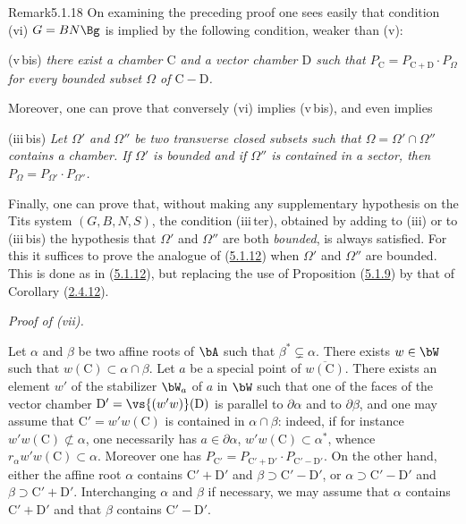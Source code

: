 \documentclass[12pt,a4paper,oneside,english]{smfart}
\makeatletter
\newcommand{\btanchor}[1]{\leavevmode\Hy@raisedlink{\hypertarget{bt:#1}{}}}
\newcommand{\btpageanchor}[1]{\Hy@raisedlink{\hypertarget{p:#1}{}}}
\newcommand{\btref}[1]{\hyperlink{bt:#1}{#1}}
\newcommand{\btpage}[1]{\marginnote{p.~#1}\btpageanchor{#1}}
\newcommand{\pg}[1]{\btpage{#1}}
\theoremstyle{definition}
\theoremstyle{bt}
\makeatother
\begin{document}
\begin{btstat}{Remark}{5.1.18}\btanchor{5.1.18}
\upshape
On examining the preceding proof one sees easily that condition (vi)
$G=BN\Bg$ is implied by the following condition, weaker than (v):

\medskip
\noindent
(v\,bis) \emph{there exist a chamber $\mathrm{C}$ and a vector chamber
$\mathrm{D}$ such that $P_{\mathrm{C}}=P_{\mathrm{C}+\mathrm{D}}\cdot P_{\Omega}$
for every bounded subset $\Omega$ of $\mathrm{C}-\mathrm{D}$.}

\medskip
Moreover, one can prove that conversely (vi) implies (v\,bis), and even implies

\medskip
\noindent
(iii\,bis) \emph{Let $\Omega'$ and $\Omega''$ be two transverse closed subsets
such that $\Omega=\Omega'\cap\Omega''$ contains a chamber. If $\Omega'$ is
bounded and if $\Omega''$ is contained in a sector, then
$P_{\Omega}=P_{\Omega'}\cdot P_{\Omega''}$.}

\medskip
Finally, one can prove that, without making any supplementary hypothesis on the
Tits system $(G,B,N,S)$, the condition (iii\,ter), obtained by adding to (iii)
or to (iii\,bis) the hypothesis that $\Omega'$ and $\Omega''$ are both
\emph{bounded}, is always satisfied. For this it suffices to prove the analogue
of (\btref{5.1.12}) when $\Omega'$ and $\Omega''$ are bounded. This is done as in
(\btref{5.1.12}), but replacing the use of Proposition (\btref{5.1.9}) by that of
Corollary (\btref{2.4.12}).
\end{btstat}

\btanchor{5.1.19}
\emph{Proof of \textup{(vii)}.}

Let $\alpha$ and $\beta$ be two affine roots of $\bA$ such that
$\beta^{*}\subsetneq\alpha$. There exists $w\in\bW$ such that
$w(\mathrm{C})\subset\alpha\cap\beta$. Let $a$ be a special point of
$\overline{w(\mathrm{C})}$. There exists an element $w'$ of the stabilizer
$\bW_{a}$ of $a$ in $\bW$ such that one of the faces of the vector chamber
$\mathrm{D}'=\vs{(w'w)}(\mathrm{D})$ is parallel to $\partial\alpha$ and to
$\partial\beta$, and one may assume that $\mathrm{C}'=w'w(\mathrm{C})$ is
contained in $\alpha\cap\beta$: \pg{89} indeed, if for instance
$w'w(\mathrm{C})\not\subset\alpha$, one necessarily has $a\in\partial\alpha$,
$w'w(\mathrm{C})\subset\alpha^{*}$, whence
$r_{\alpha}w'w(\mathrm{C})\subset\alpha$. Moreover one has
$P_{\mathrm{C}'}=P_{\mathrm{C}'+\mathrm{D}'}\cdot P_{\mathrm{C}'-\mathrm{D}'}$.
On the other hand, either the affine root $\alpha$ contains
$\mathrm{C}'+\mathrm{D}'$ and $\beta\supset \mathrm{C}'-\mathrm{D}'$, or
$\alpha\supset \mathrm{C}'-\mathrm{D}'$ and $\beta\supset \mathrm{C}'+\mathrm{D}'$.
Interchanging $\alpha$ and $\beta$ if necessary, we may assume that $\alpha$
contains $\mathrm{C}'+\mathrm{D}'$ and that $\beta$ contains
$\mathrm{C}'-\mathrm{D}'$.
\end{document}
